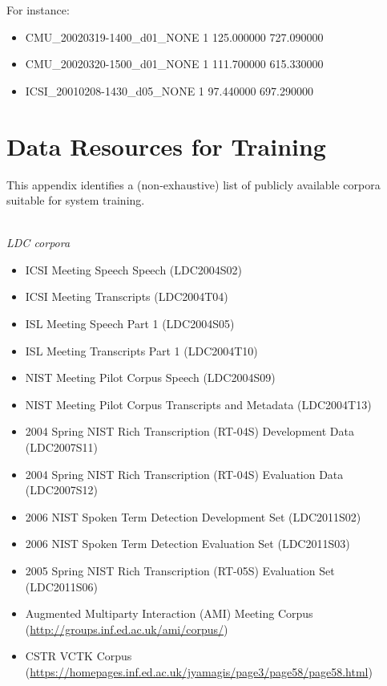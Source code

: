 \documentclass{article}
\begin{document}
\begin{appendices}
For instance:
%
\begin{itemize}
    \item[] CMU_20020319-1400_d01_NONE 1 125.000000 727.090000
    \item[] CMU_20020320-1500_d01_NONE 1 111.700000 615.330000
    \item[] ICSI_20010208-1430_d05_NONE 1 97.440000 697.290000
\end{itemize}



\newpage
\section{Data Resources for Training}
\label{app:data}
This appendix identifies a (non-exhaustive) list of publicly available corpora suitable for system training.


\vspace{0.5cm}
 \\
{\it LDC corpora}
\begin{itemize}
    \item ICSI Meeting Speech Speech (LDC2004S02)
    \item ICSI Meeting Transcripts (LDC2004T04)
    \item ISL Meeting Speech Part 1 (LDC2004S05)
    \item ISL Meeting Transcripts Part 1 (LDC2004T10)
    \item NIST Meeting Pilot Corpus Speech (LDC2004S09)
    \item NIST Meeting Pilot Corpus Transcripts and Metadata (LDC2004T13)
    \item 2004 Spring NIST Rich Transcription (RT-04S) Development Data (LDC2007S11)
    \item 2004 Spring NIST Rich Transcription (RT-04S) Evaluation Data (LDC2007S12)
    \item 2006 NIST Spoken Term Detection Development Set (LDC2011S02)
    \item 2006 NIST Spoken Term Detection Evaluation Set (LDC2011S03)
    \item 2005 Spring NIST Rich Transcription (RT-05S) Evaluation Set (LDC2011S06)
\end{itemize}

\vspace{0.25cm}
\begin{itemize}
    \item Augmented Multiparty Interaction (AMI) Meeting Corpus (\url{http://groups.inf.ed.ac.uk/ami/corpus/})
    \item CSTR VCTK Corpus (\url{https://homepages.inf.ed.ac.uk/jyamagis/page3/page58/page58.html})
\end{itemize}




\end{appendices}
\end{document}
